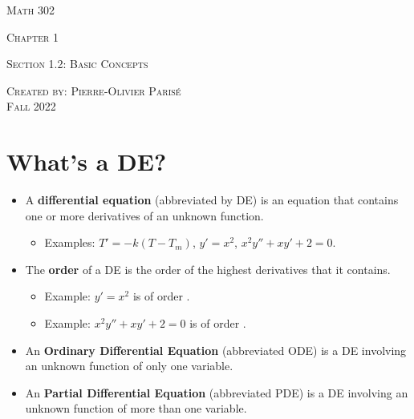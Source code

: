 \documentclass[12pt,a4paper]{article}
\begin{document}
\thispagestyle{empty}

\begin{center}
\vspace*{2.5cm}

{\Huge \textsc{Math 302}}

\vspace*{2cm}

{\LARGE \textsc{Chapter 1}} 

\vspace*{0.75cm}

\noindent\textsc{Section 1.2: Basic Concepts}

\vspace*{0.75cm}

\tableofcontents

\vfill

\noindent \textsc{Created by: Pierre-Olivier Paris{\'e}} \\
\textsc{Fall 2022}
\end{center}

\newpage

\section{What's a DE?}

\begin{itemize}
\item A \textbf{differential equation} (abbreviated by DE) is an equation that contains one or more derivatives of an unknown function.
	\begin{itemize}
	\item Examples: $T' = -k (T - T_m)$, $y' = x^2$, $x^2 y'' + xy' + 2 = 0$.
	\end{itemize}
\item The \textbf{order} of a DE is the order of the highest derivatives that it contains.
	\begin{itemize}
	\item Example: $y' = x^2$ is of order \underline{\phantom{222222}}.
	\item Example: $x^2 y'' + xy' + 2 = 0$ is of order \underline{\phantom{222222}}.
	\end{itemize}
\item An \textbf{Ordinary Differential Equation} (abbreviated ODE) is a DE involving an unknown function of only one variable.
\item An \textbf{Partial Differential Equation} (abbreviated PDE) is a DE involving an unknown function of more than one variable.
\end{itemize}
\end{document}
